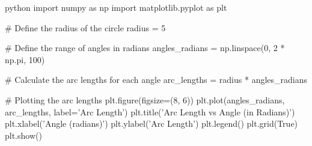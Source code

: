 python
import numpy as np
import matplotlib.pyplot as plt

# Define the radius of the circle
radius = 5

# Define the range of angles in radians
angles_radians = np.linspace(0, 2 * np.pi, 100)

# Calculate the arc lengths for each angle
arc_lengths = radius * angles_radians

# Plotting the arc lengths
plt.figure(figsize=(8, 6))
plt.plot(angles_radians, arc_lengths, label='Arc Length')
plt.title('Arc Length vs Angle (in Radians)')
plt.xlabel('Angle (radians)')
plt.ylabel('Arc Length')
plt.legend()
plt.grid(True)
plt.show()